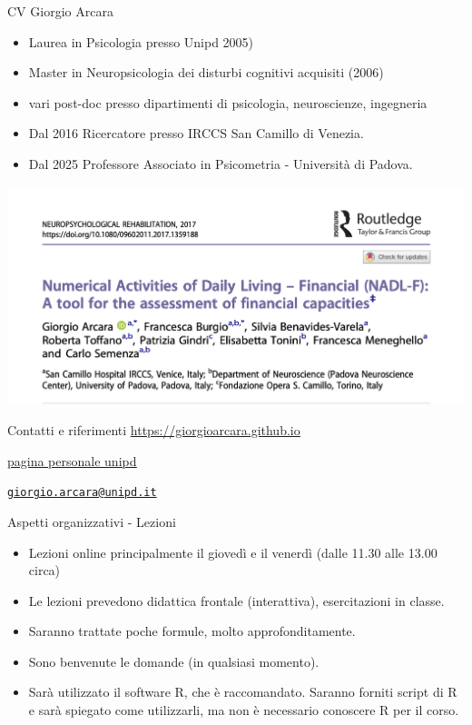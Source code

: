 \documentclass[
  ignorenonframetext,
]{beamer}
\providecommand{\tightlist}{%
  \setlength{\itemsep}{0pt}\setlength{\parskip}{0pt}}
\begin{document}
\begin{frame}{CV Giorgio Arcara}
\label{cv-giorgio-arcara}
\footnotesize

\begin{itemize}[<+->]
\item
  Laurea in Psicologia presso Unipd 2005)
\item
  Master in Neuropsicologia dei disturbi cognitivi acquisiti (2006)
\item
  vari post-doc presso dipartimenti di psicologia, neuroscienze,
  ingegneria
\item
  Dal 2016 Ricercatore presso IRCCS San Camillo di Venezia.
\item
  Dal 2025 Professore Associato in Psicometria - Università di Padova.
\end{itemize}

\hfill
\includegraphics[width=0.6\linewidth,height=\textheight,keepaspectratio]{Figures/NADL_F.png}
\end{frame}

\begin{frame}{Contatti e riferimenti}
\label{contatti-e-riferimenti}
\href{https://giorgioarcara.github.io}{\ul{https://giorgioarcara.github.io}}

\href{https://www.dpg.unipd.it/category/ruoli/personale-docente?key=4D0707A2DD6FCCD50B90E4C9F316A625}{\ul{pagina
personale unipd}}

\href{mailto:giorgio.arcara@unipd.it}{\nolinkurl{giorgio.arcara@unipd.it}}
\end{frame}

\begin{frame}{Aspetti organizzativi - Lezioni}
\label{aspetti-organizzativi---lezioni}
\begin{itemize}[<+->]
\tightlist
\item
  Lezioni online principalmente il giovedì e il venerdì (dalle 11.30
  alle 13.00 circa)
\item
  Le lezioni prevedono didattica frontale (interattiva), esercitazioni
  in classe.
\item
  Saranno trattate poche formule, molto approfonditamente.
\item
  Sono benvenute le domande (in qualsiasi momento).
\item
  Sarà utilizzato il software R, che è raccomandato. Saranno forniti
  script di R e sarà spiegato come utilizzarli, ma non è necessario
  conoscere R per il corso.
\end{itemize}
\end{frame}
\end{document}
